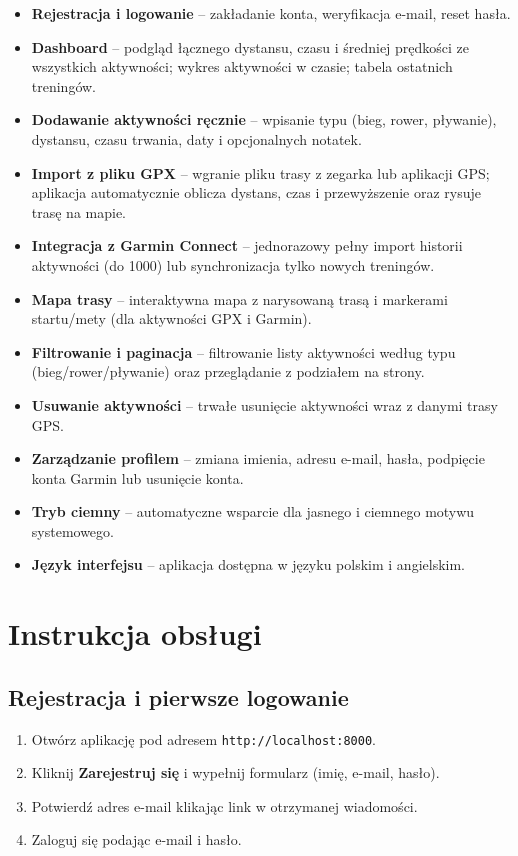 \documentclass[12pt,a4paper]{report}
\begin{document}
\begin{itemize}
    \item \textbf{Rejestracja i logowanie} -- zakładanie konta, weryfikacja e-mail, reset hasła.
    \item \textbf{Dashboard} -- podgląd łącznego dystansu, czasu i średniej prędkości ze wszystkich aktywności; wykres aktywności w czasie; tabela ostatnich treningów.
    \item \textbf{Dodawanie aktywności ręcznie} -- wpisanie typu (bieg, rower, pływanie), dystansu, czasu trwania, daty i opcjonalnych notatek.
    \item \textbf{Import z pliku GPX} -- wgranie pliku trasy z zegarka lub aplikacji GPS; aplikacja automatycznie oblicza dystans, czas i przewyższenie oraz rysuje trasę na mapie.
    \item \textbf{Integracja z Garmin Connect} -- jednorazowy pełny import historii aktywności (do 1000) lub synchronizacja tylko nowych treningów.
    \item \textbf{Mapa trasy} -- interaktywna mapa z narysowaną trasą i markerami startu/mety (dla aktywności GPX i Garmin).
    \item \textbf{Filtrowanie i paginacja} -- filtrowanie listy aktywności według typu (bieg/rower/pływanie) oraz przeglądanie z podziałem na strony.
    \item \textbf{Usuwanie aktywności} -- trwałe usunięcie aktywności wraz z danymi trasy GPS.
    \item \textbf{Zarządzanie profilem} -- zmiana imienia, adresu e-mail, hasła, podpięcie konta Garmin lub usunięcie konta.
    \item \textbf{Tryb ciemny} -- automatyczne wsparcie dla jasnego i ciemnego motywu systemowego.
    \item \textbf{Język interfejsu} -- aplikacja dostępna w języku polskim i angielskim.
\end{itemize}

\section{Instrukcja obsługi}

\subsection{Rejestracja i pierwsze logowanie}

\begin{enumerate}[noitemsep]
    \item Otwórz aplikację pod adresem \texttt{http://localhost:8000}.
    \item Kliknij \textbf{Zarejestruj się} i wypełnij formularz (imię, e-mail, hasło).
    \item Potwierdź adres e-mail klikając link w otrzymanej wiadomości.
    \item Zaloguj się podając e-mail i hasło.
\end{enumerate}
\end{document}

